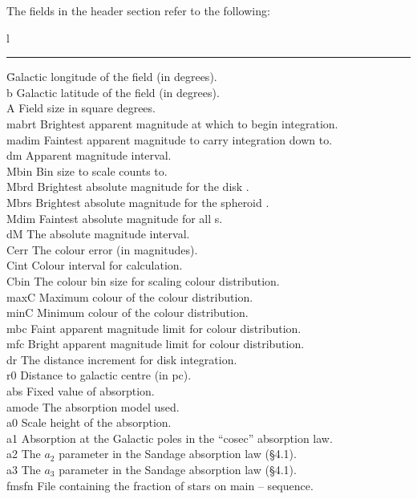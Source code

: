\documentclass[11pt,twoside]{article}
\begin{document}
The fields in the header section refer to the following:
\begin{tabbing}
l \rule{2cm}{0cm} \= Galactic longitude of the field (in degrees). \\
b \> Galactic latitude of the field (in degrees). \\
A \> Field size in square degrees. \\
mabrt \> Brightest apparent magnitude at which to begin integration.\\
madim \> Faintest apparent magnitude to carry integration down to.\\
dm \> Apparent magnitude interval. \\
Mbin \> Bin size to scale counts to. \\
Mbrd \> Brightest absolute magnitude for the disk \lf . \\
Mbrs \> Brightest absolute magnitude for the spheroid \lf .\\
Mdim \> Faintest absolute magnitude for all \lf s.\\
dM \> The absolute magnitude interval. \\
Cerr \> The colour error (in magnitudes). \\
Cint \> Colour interval for calculation. \\
Cbin \> The colour bin size for scaling colour distribution. \\
maxC \> Maximum colour of the colour distribution.\\
minC \> Minimum colour of the colour distribution. \\
mbc  \> Faint apparent magnitude limit for colour distribution. \\
mfc  \> Bright apparent magnitude limit for colour distribution. \\
dr  \> The distance increment for disk integration. \\
r0  \> Distance to galactic centre (in pc). \\
abs \> Fixed value of absorption. \\
amode \> The absorption model used. \\
a0 \> Scale height of the absorption. \\
a1 \> Absorption at the Galactic poles in the ``cosec'' absorption law. \\
a2 \> The $a_2$ parameter in the Sandage absorption law (\S4.1). \\
a3 \> The $a_3$ parameter in the Sandage absorption law (\S4.1). \\
fmsfn \> File containing the fraction of stars on main -- sequence. \\

\end{tabbing}
\end{document}
